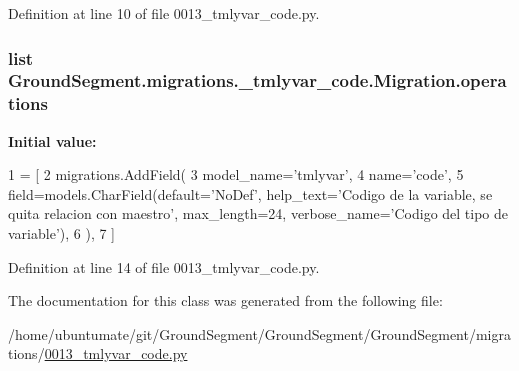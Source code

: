 Definition at line 10 of file 0013\+\_\+tmlyvar\+\_\+code.\+py.

\hypertarget{class_ground_segment_1_1migrations_1_10013__tmlyvar__code_1_1_migration_a05a093418351362cd5907ac2a99d6292}{}
\subsubsection[{operations}]{\setlength{\rightskip}{0pt plus 5cm}list Ground\+Segment.\+migrations.\+\_\+tmlyvar\+\_\+code.\+Migration.\+operations\hspace{0.3cm}{\ttfamily [static]}}\label{class_ground_segment_1_1migrations_1_10013__tmlyvar__code_1_1_migration_a05a093418351362cd5907ac2a99d6292}
{\bfseries Initial value\+:}
\begin{DoxyCode}
1 = [
2         migrations.AddField(
3             model\_name=\textcolor{stringliteral}{'tmlyvar'},
4             name=\textcolor{stringliteral}{'code'},
5             field=models.CharField(default=\textcolor{stringliteral}{'NoDef'}, help\_text=\textcolor{stringliteral}{'Codigo de la variable, se quita relacion con
       maestro'}, max\_length=24, verbose\_name=\textcolor{stringliteral}{'Codigo del tipo de variable'}),
6         ),
7     ]
\end{DoxyCode}


Definition at line 14 of file 0013\+\_\+tmlyvar\+\_\+code.\+py.



The documentation for this class was generated from the following file\+:\begin{DoxyCompactItemize}
\item 
/home/ubuntumate/git/\+Ground\+Segment/\+Ground\+Segment/\+Ground\+Segment/migrations/\hyperlink{0013__tmlyvar__code_8py}{0013\+\_\+tmlyvar\+\_\+code.\+py}\end{DoxyCompactItemize}
